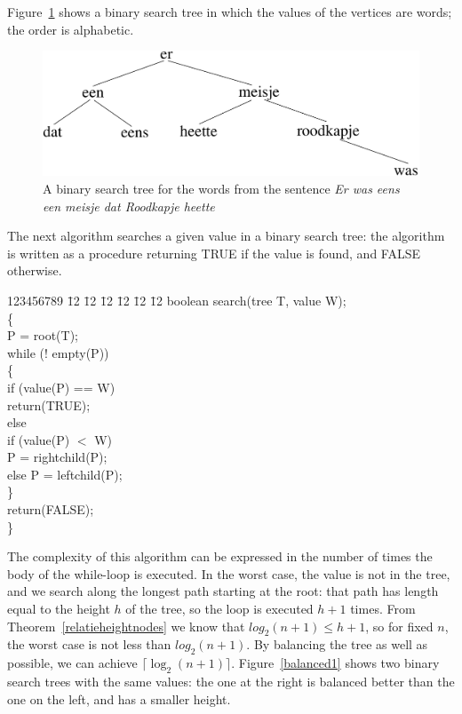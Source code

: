 Figure~\ref{binboom1} shows a binary search tree in which the values
of the vertices are words; the order is alphabetic.

\begin{figure}[ht]
\begin{center}
\includegraphics[width=0.6\linewidth,keepaspectratio]{binboom1}
\end{center}
\caption{A binary search tree for the words from the sentence
{\em Er was eens een meisje dat Roodkapje heette} \label{binboom1}}
\end{figure}

The next algorithm searches a given value in a binary search tree: the
algorithm is written as a procedure returning TRUE if the value is
found, and FALSE otherwise.


\parbox{9cm}{
\begin{tabbing}
123456789 \= 12 \= 12 \= 12 \= 12 \= 12 \= 12 \kill
\> boolean search(tree T, value W);\\
\> \{\\
\> \> P = root(T);\\
\> \> while (! empty(P))\\
\> \> \{\\
\> \> \> if (value(P) == W)\\
\> \> \> \> \> return(TRUE);\\
\> \> \> else\\
\> \> \> if (value(P) $<$ W)\\
\> \> \> \> P = rightchild(P);\\
\> \> \> else P = leftchild(P);\\
\> \> \}\\
\> \> return(FALSE);\\
\> \}
\end{tabbing}
}

The complexity of this algorithm can be expressed in the number of
times the body of the while-loop is executed. In the worst case,
the value is not in the tree, and we search along the longest path
starting at the root: that path has length equal to the height $h$ of
the tree, so the loop is executed $h+1$ times. From
Theorem~\ref{relatieheightnodes} we know that $log_2(n+1) \leq h+1$, so
for fixed $n$, the worst case is not less than $log_2(n+1)$. By balancing
the tree as well as possible, we can achieve $\lceil \log_2(n+1)
\rceil$. Figure~\ref{balanced1} shows two binary search trees with the
same values: the one at the right is balanced better than the one on
the left, and has a smaller height.

